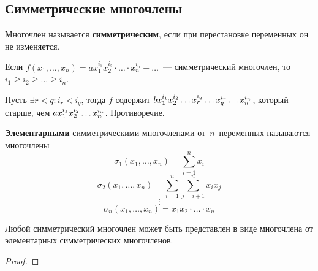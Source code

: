 \subsection{Симметрические многочлены}
Многочлен называется \textbf{симметрическим}, если при перестановке переменных он не изменяется.

\begin{statement}
Если $f(x_1, \ldots, x_n) = a x_1^{i_1} x_2^{i_2} \cdot \ldots \cdot x_n^{i_n} + \ldots$~--- симметрический многочлен, то $i_1 \geqslant i_2 \geqslant \ldots \geqslant i_n$.
\end{statement}
\begin{proofcontra}
Пусть $\exists r < q \colon i_r < i_q$, тогда $f$ содержит
$b x_1^{i_1} \* x_2^{i_2} \* \ldots \* x_r^{i_q} \* \ldots \* x_q^{i_r} \* \ldots \* x_n^{i_n}$, который старше, чем
$a x_1^{i_1} \* x_2^{i_2} \* \ldots \* x_n^{i_n}$. Противоречие.
\end{proofcontra}

\textbf{Элементарными} симметрическими многочленами от~$n$~переменных называются многочлены
\begin{equation*}
\sigma_1(x_1, \ldots, x_n) = \sum_{i=1}^n x_i
\end{equation*}
\begin{equation*}
\sigma_2(x_1, \ldots, x_n) = \sum_{i=1}^n \sum_{j=i+1}^n x_i x_j
\end{equation*}
\begin{equation*}
\vdots
\end{equation*}
\begin{equation*}
\sigma_n(x_1, \ldots, x_n) = x_1 x_2 \cdot \ldots \cdot x_n 
\end{equation*}

\begin{theorem}
Любой симметрический многочлен может быть представлен в виде многочлена от элементарных симметрических многочленов.
\end{theorem}
\begin{proof}

\end{proof}
